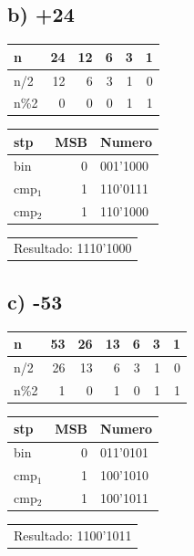 \documentclass[12pt]{article}
\begin{document}
\subsection*{b) +24}
\label{sec:orgdc5c218}
\begin{mdframed}
\begin{center}
\begin{tabular}{lrrrrr}
n & 24 & 12 & 6 & 3 & 1\\
\hline
n/2 & 12 & 6 & 3 & 1 & 0\\
n\%2 & 0 & 0 & 0 & 1 & 1\\
\end{tabular}
\end{center}

\begin{center}
\begin{tabular}{lrl}
stp & MSB & Numero\\
\hline
bin & 0 & 001'1000\\
cmp\(_{\text{1}}\) & 1 & 110'0111\\
cmp\(_{\text{2}}\) & 1 & 110'1000\\
\end{tabular}
\end{center}

\begin{center}
\begin{tabular}{l}
Resultado: 1110'1000\\
\end{tabular}
\end{center}
\end{mdframed}

\subsection*{c) -53}
\label{sec:org76f3d8a}
\begin{mdframed}
\begin{center}
\begin{tabular}{lrrrrrr}
n & 53 & 26 & 13 & 6 & 3 & 1\\
\hline
n/2 & 26 & 13 & 6 & 3 & 1 & 0\\
n\%2 & 1 & 0 & 1 & 0 & 1 & 1\\
\end{tabular}
\end{center}

\begin{center}
\begin{tabular}{lrl}
stp & MSB & Numero\\
\hline
bin & 0 & 011'0101\\
cmp\(_{\text{1}}\) & 1 & 100'1010\\
cmp\(_{\text{2}}\) & 1 & 100'1011\\
\end{tabular}
\end{center}

\begin{center}
\begin{tabular}{l}
Resultado: 1100'1011\\
\end{tabular}
\end{center}
\end{mdframed}
\end{document}
